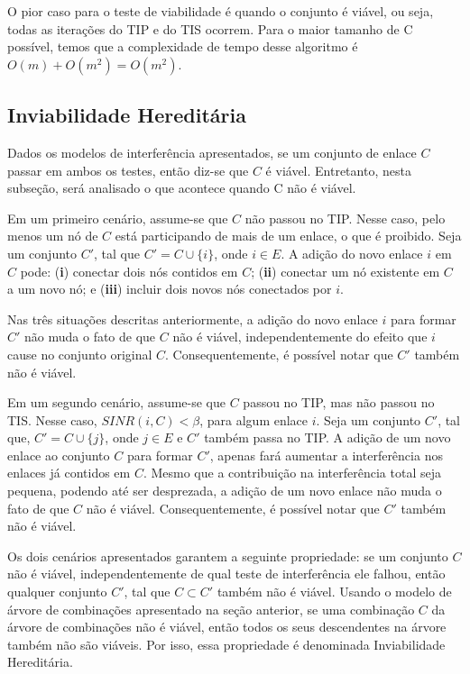 O pior caso para o teste de viabilidade é quando o conjunto é viável, ou seja, todas as iterações do TIP e do TIS ocorrem. Para o maior tamanho de C possível, temos que a complexidade de tempo desse algoritmo é $O(m)+O(m^2)=O(m^2)$.

\subsection{Inviabilidade Hereditária}

Dados os modelos de interferência apresentados, se um conjunto de enlace $C$ passar em ambos os testes, então diz-se que $C$ é viável. Entretanto, nesta subseção, será analisado o que acontece quando C não é viável.

Em um primeiro cenário, assume-se que $C$ não passou no TIP. Nesse caso, pelo menos um nó de $C$ está participando de mais de um enlace, o que é proibido. Seja um conjunto $C'$, tal que $C' = C \cup \{i\}$, onde $i \in E$. A adição do novo enlace $i$ em $C$ pode: ({\bf i}) conectar dois nós contidos em $C$; ({\bf ii}) conectar um nó existente em $C$ a um novo nó; e ({\bf iii}) incluir dois novos nós conectados por $i$. 
  
Nas três situações descritas anteriormente, a adição do novo enlace $i$ para formar $C'$ não muda o fato de que $C$ não é viável, independentemente do efeito que $i$ cause no conjunto original $C$. Consequentemente, é possível notar que $C'$ também não é viável.

Em um segundo cenário, assume-se que $C$ passou no TIP, mas não passou no TIS. Nesse caso, $SINR(i,C) < \beta$, para algum enlace $i$. Seja um conjunto $C'$, tal que, $C' = C \cup \{j\}$, onde $j \in E$ e $C'$ também passa no TIP. A adição de um novo enlace ao conjunto $C$ para formar $C'$, apenas fará aumentar a interferência nos enlaces já contidos em $C$. Mesmo que a contribuição na interferência total seja pequena, podendo até ser desprezada, a adição de um novo enlace não muda o fato de que $C$ não é viável. Consequentemente, é possível notar que $C'$ também não é viável.

Os dois cenários apresentados garantem a seguinte propriedade: se um conjunto $C$ não é viável, independentemente de qual teste de interferência ele falhou, então qualquer conjunto $C'$, tal que $C \subset C'$ também não é viável. Usando o modelo de árvore de combinações apresentado na seção anterior, se uma combinação $C$ da árvore de combinações não é viável, então todos os seus descendentes na árvore também não são viáveis. Por isso, essa propriedade é denominada Inviabilidade Hereditária. 

